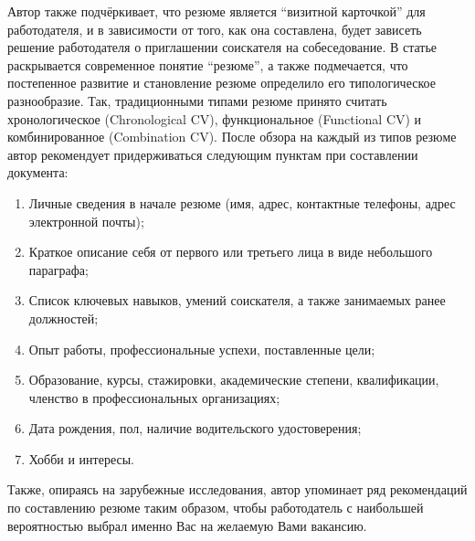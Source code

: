 \documentclass[master, och, pract]{SCWorks}
\begin{document}
Автор также подчёркивает, что резюме является “визитной карточкой” для работодателя, 
и в зависимости от того, как она составлена, будет зависеть решение работодателя 
о приглашении соискателя на собеседование. В статье раскрывается современное 
понятие “резюме”, а также подмечается, что постепенное развитие и становление 
резюме определило его типологическое разнообразие. Так, традиционными типами 
резюме принято считать хронологическое (Chronological CV), функциональное 
(Functional CV) и комбинированное (Combination CV). После обзора на каждый из 
типов резюме автор рекомендует придерживаться следующим пунктам при 
составлении документа:
\begin{enumerate}
    \item Личные сведения в начале резюме (имя, адрес, контактные телефоны, 
    адрес электронной почты); 
    \item Краткое описание себя от первого или третьего лица в виде небольшого параграфа;
    \item Список ключевых навыков, умений соискателя, а также занимаемых ранее должностей;
    \item Опыт работы, профессиональные успехи, поставленные цели;
    \item Образование, курсы, стажировки, академические степени, 
    квалификации, членство в профессиональных организациях; 
    \item Дата рождения, пол, наличие водительского удостоверения; 
    \item Хобби и интересы.
\end{enumerate}

Также, опираясь на зарубежные исследования, автор упоминает ряд рекомендаций по 
составлению резюме таким образом, чтобы работодатель с наибольшей вероятностью 
выбрал именно Вас на желаемую Вами вакансию.
\end{document}
